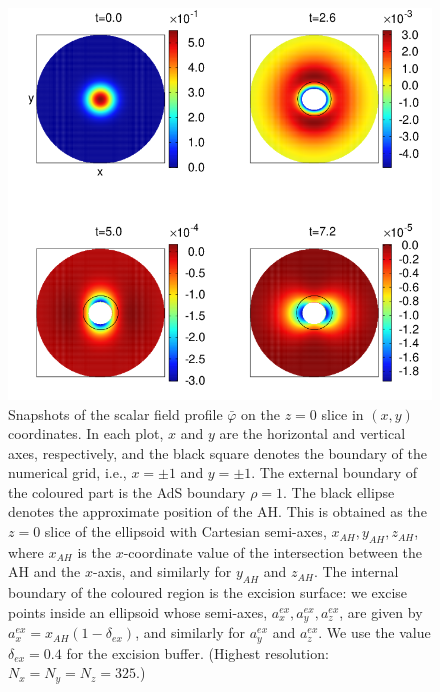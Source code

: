 \documentclass[a4paper,11pt]{article}
\numberwithin{equation}{section}
\begin{document}
\begin{figure}[!h]
        \centering
        \includegraphics[width=5.2in,clip=true]{plots/bulkplots/L3/phi1/phi1_L3_snapshots_2by2.png}
\parbox{5.0in}{\caption{Snapshots of the scalar field profile $\bar{\varphi}$ on the $z=0$ slice in $(x,y)$ coordinates. In each plot, $x$ and $y$ are the horizontal and vertical axes, respectively, and the black square denotes the boundary of the numerical grid, i.e., $x=\pm 1$ and $y=\pm 1$. The external boundary of the coloured part is the AdS boundary $\rho=1$. The black ellipse denotes the approximate position of the AH. This is obtained as the $z=0$ slice of the ellipsoid with Cartesian semi-axes, $x_{AH},y_{AH},z_{AH}$, where $x_{AH}$ is the $x$-coordinate value of the intersection between the AH and the $x$-axis, and similarly for $y_{AH}$ and $z_{AH}$.
The internal boundary of the coloured region is the excision surface: we excise points inside an ellipsoid whose semi-axes, $a_x^{ex},a_y^{ex},a_z^{ex}$, are given by $a_x^{ex}=x_{AH}(1-\delta_{ex})$, and similarly for $a_y^{ex}$ and $a_z^{ex}$. We use the value $\delta_{ex}=0.4$ for the excision buffer. (Highest resolution: $N_x=N_y=N_z=325$.)
        }\label{fig:snapshotsscalarfield}}
\end{figure}
\end{document}
